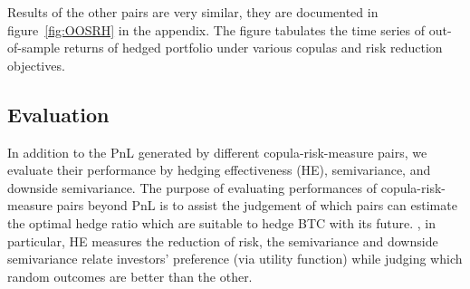 Results of the other pairs are very similar, they are documented in
figure~\ref{fig:OOSRH} in the appendix.
The figure tabulates the time series of out-of-sample returns of hedged portfolio under various copulas and risk reduction objectives.\medskip

\subsection{Evaluation}
In addition to the PnL generated by different copula-risk-measure pairs,
we evaluate their performance by hedging effectiveness (HE), semivariance, and downside semivariance.
The purpose of evaluating performances of copula-risk-measure pairs beyond PnL is to assist the judgement of which pairs can estimate the optimal hedge ratio which
are suitable to hedge BTC with its future.
, in particular, HE measures the reduction of risk, the semivariance and downside semivariance relate investors' preference
(via utility function) while judging which random outcomes are better than the other.

%

